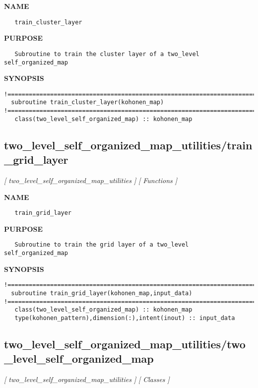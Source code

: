 \documentclass{article}
\begin{document}
\label{ch:robo78}
\label{ch:two_level_self_organized_map_utilities_train_cluster_layer}
\textbf{NAME}
\begin{verbatim}
   train_cluster_layer
\end{verbatim}
\textbf{PURPOSE}
\begin{verbatim}
   Subroutine to train the cluster layer of a two_level self_organized_map 
\end{verbatim}
\textbf{SYNOPSIS}
\begin{verbatim}
!========================================================================================
  subroutine train_cluster_layer(kohonen_map)
!========================================================================================
   class(two_level_self_organized_map) :: kohonen_map
\end{verbatim}
\newpage
\subsection{two\_level\_self\_organized\_map\_utilities/train\_grid\_layer}
\textsl{[ two\_level\_self\_organized\_map\_utilities ]}
\textsl{[ Functions ]}

\label{ch:robo79}
\label{ch:two_level_self_organized_map_utilities_train_grid_layer}
\textbf{NAME}
\begin{verbatim}
   train_grid_layer
\end{verbatim}
\textbf{PURPOSE}
\begin{verbatim}
   Subroutine to train the grid layer of a two_level self_organized_map 
\end{verbatim}
\textbf{SYNOPSIS}
\begin{verbatim}
!========================================================================================
  subroutine train_grid_layer(kohonen_map,input_data)
!========================================================================================
   class(two_level_self_organized_map) :: kohonen_map
   type(kohonen_pattern),dimension(:),intent(inout) :: input_data
\end{verbatim}
\newpage
\subsection{two\_level\_self\_organized\_map\_utilities/two\_level\_self\_organized\_map}
\textsl{[ two\_level\_self\_organized\_map\_utilities ]}
\textsl{[ Classes ]}
\end{document}
